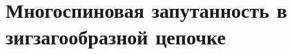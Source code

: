 \chapter{Многоспиновая запутанность в зигзагообразной цепочке}
\label{chapter:manayparticle-entantlement-in-zigzag-chain}


%
%
%
%
%
%

